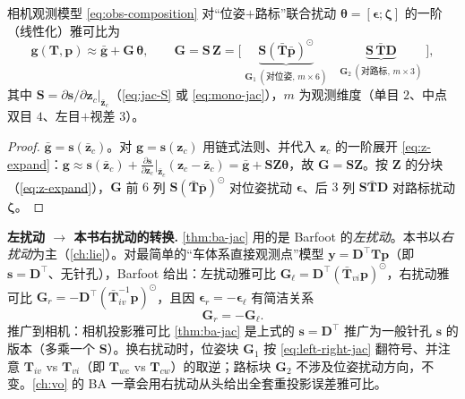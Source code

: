 \begin{theorem}[BA 投影雅可比]\label{thm:ba-jac}
相机观测模型 \cref{eq:obs-composition} 对“位姿$+$路标”联合扰动 $\boldsymbol\theta=[\boldsymbol\epsilon;\boldsymbol\zeta]$ 的一阶（线性化）雅可比为
\begin{equation}
  \mathbf{g}(\mathbf{T},\mathbf{p})\approx\bar{\mathbf{g}}+\mathbf{G}\,\boldsymbol\theta,\qquad
  \mathbf{G}=\mathbf{S}\,\mathbf{Z}
  =\big[\;\underbrace{\mathbf{S}(\bar{\mathbf{T}}\bar{\mathbf{p}})^{\odot}}_{\mathbf{G}_1\ (\text{对位姿},\,m\times6)}
  \quad \underbrace{\mathbf{S}\,\bar{\mathbf{T}}\mathbf{D}}_{\mathbf{G}_2\ (\text{对路标},\,m\times3)}\;\big],
  \label{eq:ba-jac}
\end{equation}
其中 $\mathbf{S}=\partial\mathbf{s}/\partial\mathbf{z}_c|_{\bar{\mathbf{z}}_c}$（\cref{eq:jac-S} 或 \cref{eq:mono-jac}），$m$ 为观测维度（单目 $2$、中点双目 $4$、左目$+$视差 $3$）。
\end{theorem}
\begin{proof}
$\bar{\mathbf{g}}=\mathbf{s}(\bar{\mathbf{z}}_c)$。对 $\mathbf{g}=\mathbf{s}(\mathbf{z}_c)$ 用链式法则、并代入 $\mathbf{z}_c$ 的一阶展开 \cref{eq:z-expand}：$\mathbf{g}\approx\mathbf{s}(\bar{\mathbf{z}}_c)+\tfrac{\partial\mathbf{s}}{\partial\mathbf{z}_c}\big|_{\bar{\mathbf{z}}_c}(\mathbf{z}_c-\bar{\mathbf{z}}_c)=\bar{\mathbf{g}}+\mathbf{S}\mathbf{Z}\boldsymbol\theta$，故 $\mathbf{G}=\mathbf{S}\mathbf{Z}$。按 $\mathbf{Z}$ 的分块（\cref{eq:z-expand}），$\mathbf{G}$ 前 $6$ 列 $\mathbf{S}(\bar{\mathbf{T}}\bar{\mathbf{p}})^\odot$ 对位姿扰动 $\boldsymbol\epsilon$、后 $3$ 列 $\mathbf{S}\bar{\mathbf{T}}\mathbf{D}$ 对路标扰动 $\boldsymbol\zeta$\cite{barfoot2024state}。
\end{proof}

\begin{note}
\textbf{左扰动 $\to$ 本书右扰动的转换.}\;
\cref{thm:ba-jac} 用的是 Barfoot 的\emph{左扰动}。本书以\emph{右扰动}为主（\cref{ch:lie}）。对最简单的“车体系直接观测点”模型 $\mathbf{y}=\mathbf{D}^\top\mathbf{T}\mathbf{p}$（即 $\mathbf{s}=\mathbf{D}^\top$、无针孔），Barfoot 给出\cite{barfoot2024state}：左扰动雅可比 $\mathbf{G}_\ell=\mathbf{D}^\top(\bar{\mathbf{T}}_{vi}\mathbf{p})^\odot$，右扰动雅可比 $\mathbf{G}_r=-\mathbf{D}^\top(\bar{\mathbf{T}}_{iv}^{-1}\mathbf{p})^\odot$，且因 $\boldsymbol\epsilon_r=-\boldsymbol\epsilon_\ell$ 有简洁关系
\begin{equation}
  \mathbf{G}_r=-\mathbf{G}_\ell.
  \label{eq:left-right-jac}
\end{equation}
推广到相机：相机投影雅可比 \cref{thm:ba-jac} 是上式的 $\mathbf{s}=\mathbf{D}^\top$ 推广为一般针孔 $\mathbf{s}$ 的版本（多乘一个 $\mathbf{S}$）。换右扰动时，位姿块 $\mathbf{G}_1$ 按 \cref{eq:left-right-jac} 翻符号、并注意 $\mathbf{T}_{iv}$ vs $\mathbf{T}_{vi}$（即 $\mathbf{T}_{wc}$ vs $\mathbf{T}_{cw}$）的取逆；路标块 $\mathbf{G}_2$ 不涉及位姿扰动方向，不变。\cref{ch:vo} 的 BA 一章会用右扰动从头给出全套重投影误差雅可比。
\end{note}

